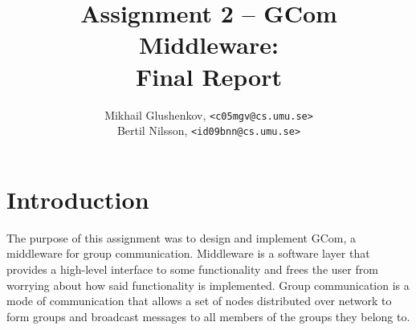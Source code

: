 \documentclass[10pt, oneside]{article}
\author{Mikhail Glushenkov, \texttt{<c05mgv@cs.umu.se>}\\
        Bertil Nilsson, \texttt{<id09bnn@cs.umu.se>}}
\title{Assignment 2 -- GCom Middleware:\\Final Report}
\begin{document}
\pagestyle{plain}


\pagebreak

\setlength{\parindent}{0pt}
\setlength{\parskip}{10pt}

\setcounter{section}{-1}

\section{Introduction}

The purpose of this assignment was to design and implement GCom, a middleware for
group communication. Middleware is a software layer that provides a high-level
interface to some functionality and frees the user from worrying about how said
functionality is implemented. Group communication is a mode of communication
that allows a set of nodes distributed over network to form groups and broadcast
messages to all members of the groups they belong to.
\end{document}
